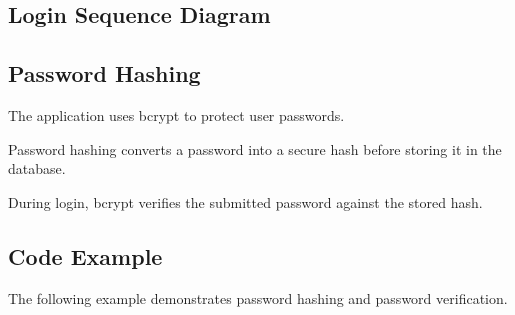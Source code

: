 \documentclass[letterpaper,10pt,english]{sphinxmanual}
\begin{document}
\subsection{Login Sequence Diagram}
\label{\detokenize{authentication:login-sequence-diagram}}

\subsection{Password Hashing}
\label{\detokenize{authentication:password-hashing}}
\sphinxAtStartPar
The application uses bcrypt to protect user passwords.

\sphinxAtStartPar
Password hashing converts a password into a secure hash before storing it
in the database.

\sphinxAtStartPar
During login, bcrypt verifies the submitted password against the stored hash.


\subsection{Code Example}
\label{\detokenize{authentication:code-example}}
\sphinxAtStartPar
The following example demonstrates password hashing and password verification.

\begin{sphinxVerbatim}[commandchars=\\\{\}]
  

  

   

 
\end{sphinxVerbatim}
\end{document}
